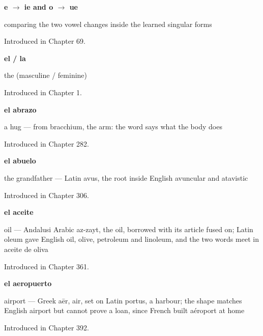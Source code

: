 \noindent\begin{minipage}[t]{\linewidth}
\raggedright
\textbf{e $\to$ ie and o $\to$ ue}\par
\small comparing the two vowel changes inside the learned singular forms\par
\footnotesize Introduced in Chapter 69.
\end{minipage}\par\medskip

\noindent\begin{minipage}[t]{\linewidth}
\raggedright
\textbf{el / la}\par
\small the (masculine / feminine)\par
\footnotesize Introduced in Chapter 1.
\end{minipage}\par\medskip

\noindent\begin{minipage}[t]{\linewidth}
\raggedright
\textbf{el abrazo}\par
\small a hug — from bracchium, the arm: the word says what the body does\par
\footnotesize Introduced in Chapter 282.
\end{minipage}\par\medskip

\noindent\begin{minipage}[t]{\linewidth}
\raggedright
\textbf{el abuelo}\par
\small the grandfather --- Latin avus, the root inside English avuncular and atavistic\par
\footnotesize Introduced in Chapter 306.
\end{minipage}\par\medskip

\noindent\begin{minipage}[t]{\linewidth}
\raggedright
\textbf{el aceite}\par
\small oil — Andalusi Arabic az-zayt, the oil, borrowed with its article fused on; Latin oleum gave English oil, olive, petroleum and linoleum, and the two words meet in aceite de oliva\par
\footnotesize Introduced in Chapter 361.
\end{minipage}\par\medskip

\noindent\begin{minipage}[t]{\linewidth}
\raggedright
\textbf{el aeropuerto}\par
\small airport — Greek aēr, air, set on Latin portus, a harbour; the shape matches English airport but cannot prove a loan, since French built aéroport at home\par
\footnotesize Introduced in Chapter 392.
\end{minipage}\par\medskip


